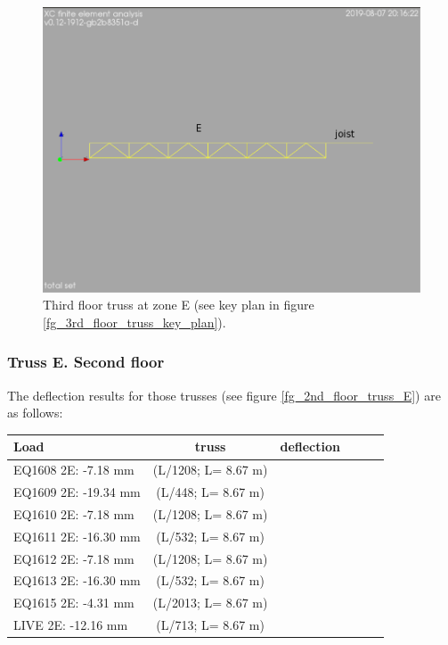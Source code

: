 \begin{figure}
  \begin{center}
  \includegraphics[width=120mm]{figures/trusses/floor_truss_E}
  \end{center}
  \caption{Third floor truss at zone E (see key plan in figure \ref{fg_3rd_floor_truss_key_plan}).}\label{fg_floor_truss_E}
\end{figure}

\subsubsection{Truss E. Second floor}
The deflection results for those trusses (see figure \ref{fg_2nd_floor_truss_E}) are as follows:

\begin{center}
  \begin{scriptsize}
  \begin{tabular}{|l|c|c|c|c|c|c|}
    \hline
    \textbf{Load} & \textbf{truss} & \multicolumn{2}{c|}{\textbf{deflection}} \\
    \hline
EQ1608 2E: -7.18  mm & (L/1208; L= 8.67 m)\\
EQ1609 2E: -19.34  mm & (L/448; L= 8.67 m)\\
EQ1610 2E: -7.18  mm & (L/1208; L= 8.67 m)\\
EQ1611 2E: -16.30  mm & (L/532; L= 8.67 m)\\
EQ1612 2E: -7.18  mm & (L/1208; L= 8.67 m)\\
EQ1613 2E: -16.30  mm & (L/532; L= 8.67 m)\\
EQ1615 2E: -4.31  mm & (L/2013; L= 8.67 m)\\
LIVE 2E: -12.16  mm & (L/713; L= 8.67 m)\\
\hline
  \end{tabular}
  \end{scriptsize}
\end{center}

